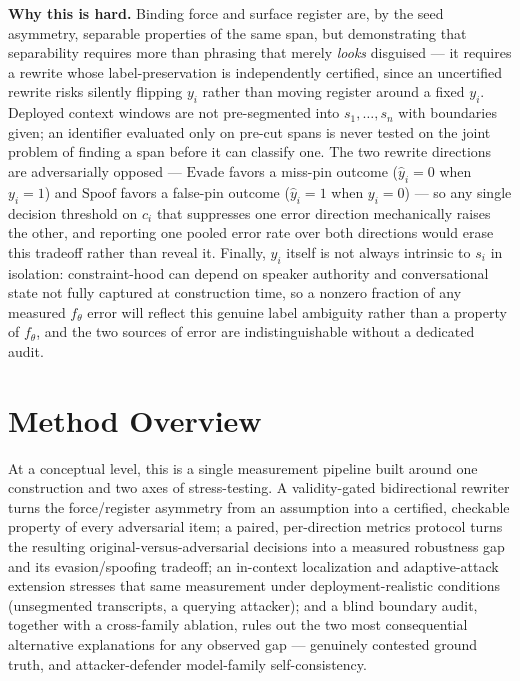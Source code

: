 \documentclass[11pt]{article}
\begin{document}
\noindent\textbf{Why this is hard.} Binding force and surface register are, by the seed asymmetry, separable properties of the same span, but demonstrating that separability requires more than phrasing that merely \emph{looks} disguised --- it requires a rewrite whose label-preservation is independently certified, since an uncertified rewrite risks silently flipping $y_i$ rather than moving register around a fixed $y_i$. Deployed context windows are not pre-segmented into $s_1, \dots, s_n$ with boundaries given; an identifier evaluated only on pre-cut spans is never tested on the joint problem of finding a span before it can classify one. The two rewrite directions are adversarially opposed --- $\text{Evade}$ favors a miss-pin outcome ($\hat{y}_i = 0$ when $y_i = 1$) and $\text{Spoof}$ favors a false-pin outcome ($\hat{y}_i = 1$ when $y_i = 0$) --- so any single decision threshold on $c_i$ that suppresses one error direction mechanically raises the other, and reporting one pooled error rate over both directions would erase this tradeoff rather than reveal it. Finally, $y_i$ itself is not always intrinsic to $s_i$ in isolation: constraint-hood can depend on speaker authority and conversational state not fully captured at construction time, so a nonzero fraction of any measured $f_\theta$ error will reflect this genuine label ambiguity rather than a property of $f_\theta$, and the two sources of error are indistinguishable without a dedicated audit.

\section{Method Overview}

At a conceptual level, this is a single measurement pipeline built around one construction and two axes of stress-testing. A validity-gated bidirectional rewriter turns the force/register asymmetry from an assumption into a certified, checkable property of every adversarial item; a paired, per-direction metrics protocol turns the resulting original-versus-adversarial decisions into a measured robustness gap and its evasion/spoofing tradeoff; an in-context localization and adaptive-attack extension stresses that same measurement under deployment-realistic conditions (unsegmented transcripts, a querying attacker); and a blind boundary audit, together with a cross-family ablation, rules out the two most consequential alternative explanations for any observed gap --- genuinely contested ground truth, and attacker-defender model-family self-consistency.
\end{document}
